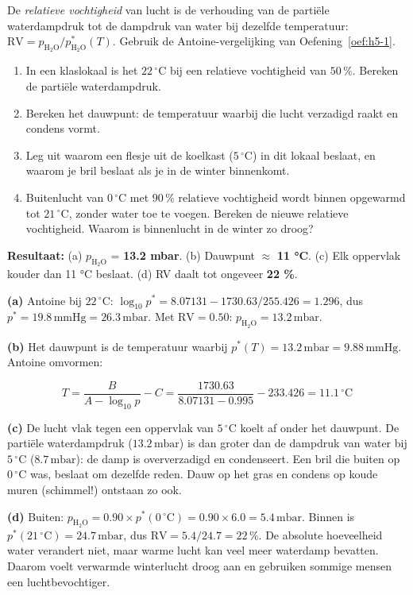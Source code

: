 \begin{oefening}
De \emph{relatieve vochtigheid} van lucht is de verhouding van de partiële waterdampdruk tot de dampdruk van water bij dezelfde temperatuur: \(\mathrm{RV} = p_{\mathrm{H_2O}}/p^*_{\mathrm{H_2O}}(T)\). Gebruik de Antoine-vergelijking van Oefening~\ref{oef:h5-1}.

\begin{enumerate}
\item[(a)]
  In een klaslokaal is het \(22\,^\circ\mathrm{C}\) bij een relatieve vochtigheid van \(50\,\%\). Bereken de partiële waterdampdruk.
\item[(b)]
  Bereken het dauwpunt: de temperatuur waarbij die lucht verzadigd raakt en condens vormt.
\item[(c)]
  Leg uit waarom een flesje uit de koelkast (\(5\,^\circ\mathrm{C}\)) in dit lokaal beslaat, en waarom je bril beslaat als je in de winter binnenkomt.
\item[(d)]
  Buitenlucht van \(0\,^\circ\mathrm{C}\) met \(90\,\%\) relatieve vochtigheid wordt binnen opgewarmd tot \(21\,^\circ\mathrm{C}\), zonder water toe te voegen. Bereken de nieuwe relatieve vochtigheid. Waarom is binnenlucht in de winter zo droog?
\end{enumerate}
\end{oefening}
\begin{oplossing}
\textbf{Resultaat:} (a) \(p_{\mathrm{H_2O}}\) = \textbf{13.2 mbar}. (b) Dauwpunt \ensuremath{\approx{}} \textbf{11 °C}. (c) Elk oppervlak kouder dan 11 °C beslaat. (d) RV daalt tot ongeveer \textbf{22 \%}.

\textbf{(a)} Antoine bij \(22\,^\circ\mathrm{C}\): \(\log_{10}p^* = 8.07131 - 1730.63/255.426 = 1.296\), dus \(p^* = 19.8\,\mathrm{mmHg} = 26.3\,\mathrm{mbar}\). Met \(\mathrm{RV} = 0.50\): \(p_{\mathrm{H_2O}} = 13.2\,\mathrm{mbar}\).

\textbf{(b)} Het dauwpunt is de temperatuur waarbij \(p^*(T) = 13.2\,\mathrm{mbar} = 9.88\,\mathrm{mmHg}\). Antoine omvormen:

\[
T = \frac{B}{A - \log_{10}p} - C = \frac{1730.63}{8.07131 - 0.995} - 233.426 = 11.1\,^\circ\mathrm{C}
\]

\textbf{(c)} De lucht vlak tegen een oppervlak van \(5\,^\circ\mathrm{C}\) koelt af onder het dauwpunt. De partiële waterdampdruk (\(13.2\,\mathrm{mbar}\)) is dan groter dan de dampdruk van water bij \(5\,^\circ\mathrm{C}\) (\(8.7\,\mathrm{mbar}\)): de damp is oververzadigd en condenseert. Een bril die buiten op \(0\,^\circ\mathrm{C}\) was, beslaat om dezelfde reden. Dauw op het gras en condens op koude muren (schimmel!) ontstaan zo ook.

\textbf{(d)} Buiten: \(p_{\mathrm{H_2O}} = 0.90 \times p^*(0\,^\circ\mathrm{C}) = 0.90 \times 6.0 = 5.4\,\mathrm{mbar}\). Binnen is \(p^*(21\,^\circ\mathrm{C}) = 24.7\,\mathrm{mbar}\), dus \(\mathrm{RV} = 5.4/24.7 = 22\,\%\). De absolute hoeveelheid water verandert niet, maar warme lucht kan veel meer waterdamp bevatten. Daarom voelt verwarmde winterlucht droog aan en gebruiken sommige mensen een luchtbevochtiger.
\end{oplossing}

